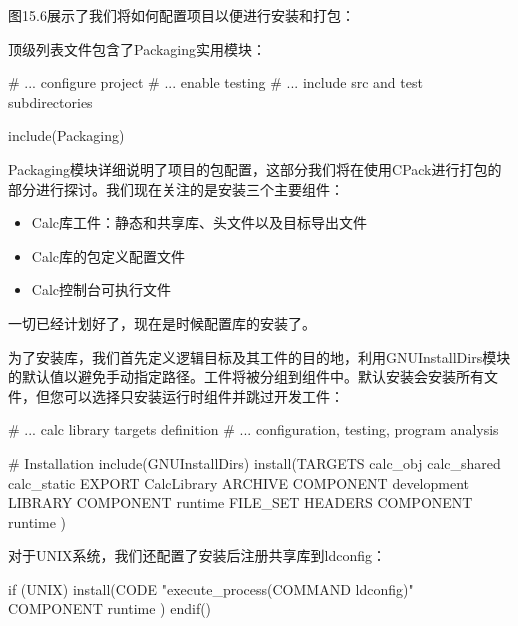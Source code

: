 
图15.6展示了我们将如何配置项目以便进行安装和打包：


顶级列表文件包含了Packaging实用模块：


\begin{cmake}
# ... configure project
# ... enable testing
# ... include src and test subdirectories

include(Packaging)
\end{cmake}

Packaging模块详细说明了项目的包配置，这部分我们将在使用CPack进行打包的部分进行探讨。我们现在关注的是安装三个主要组件：

\begin{itemize}
\item
Calc库工件：静态和共享库、头文件以及目标导出文件

\item
Calc库的包定义配置文件

\item
Calc控制台可执行文件
\end{itemize}

一切已经计划好了，现在是时候配置库的安装了。


为了安装库，我们首先定义逻辑目标及其工件的目的地，利用GNUInstallDirs模块的默认值以避免手动指定路径。工件将被分组到组件中。默认安装会安装所有文件，但您可以选择只安装运行时组件并跳过开发工件：


\begin{cmake}
# ... calc library targets definition
# ... configuration, testing, program analysis

# Installation
include(GNUInstallDirs)
install(TARGETS calc_obj calc_shared calc_static
    EXPORT CalcLibrary
    ARCHIVE COMPONENT development
    LIBRARY COMPONENT runtime
    FILE_SET HEADERS COMPONENT runtime
)
\end{cmake}

对于UNIX系统，我们还配置了安装后注册共享库到ldconfig：


\begin{cmake}
if (UNIX)
    install(CODE "execute_process(COMMAND ldconfig)"
        COMPONENT runtime
    )
endif()
\end{cmake}

